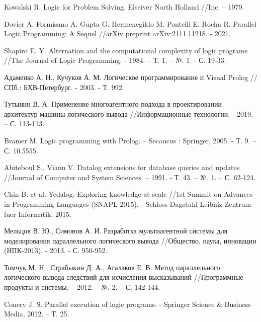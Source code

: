\renewcommand\bibname{Список литературы}

\begin{thebibliography}{5}
	\makeatletter
	\def\@biblabel#1{#1. }
	Kowalski R. Logic for Problem Solving. Elseiver North Holland //Inc. – 1979.
	
	Dovier A. Formisano A. Gupta G. Hermenegildo M. Pontelli E. Rocha R. Parallel Logic Programming: A Sequel //arXiv preprint arXiv:2111.11218. - 2021.
	
	Shapiro E. Y. Alternation and the computational complexity of logic programs //The Journal of Logic Programming. - 1984. – Т. 1. – №. 1. - С. 19-33.
	
	Адаменко А. Н., Кучуков А. М. Логическое программирование и Visual Prolog //СПб.: БХВ-Петербург. - 2003. - Т. 992.
	
	Тутынин В. А. Применение многоагентного подхода в проектировании архитектур машины логического вывода //Информационные технологии. - 2019. – С. 113-113.
	
	Bramer M. Logic programming with Prolog. – Secaucus : Springer, 2005. - Т. 9. – С. 10.5555.
	
	Abiteboul S., Vianu V. Datalog extensions for database queries and updates //Journal of Computer and System Sciences. – 1991. - Т. 43. – №. 1. – С. 62-124.
	
	Chin B. et al. Yedalog: Exploring knowledge at scale //1st Summit on Advances in Programming Languages (SNAPL 2015). - Schloss Dagstuhl-Leibniz-Zentrum fuer Informatik, 2015.
	
	Мельцов В. Ю., Симонов А. И. Разработка мультиагентной системы для моделирования параллельного логического вывода //Общество, наука, инновации (НПК-2013). - 2013. - С. 950-952.
	
	Томчук М. Н., Страбыкин Д. А., Агалаков Е. В. Метод параллельного логического вывода следствий для исчисления высказываний //Программные продукты и системы. – 2012. – №. 2. – С. 142-144.
	
	Conery J. S. Parallel execution of logic programs. - Springer Science \& Business Media, 2012. – Т. 25.
	

\end{thebibliography}
